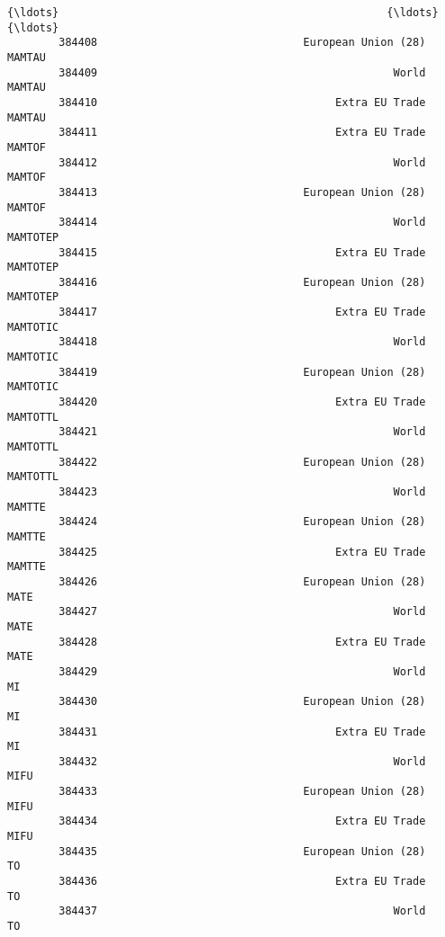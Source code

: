 \documentclass[11pt]{article}
\begin{document}
\begin{Verbatim}[commandchars=\\\{\}]
        {\ldots}                                                   {\ldots}            {\ldots}   
        384408                                European Union (28)       MAMTAU     
        384409                                              World       MAMTAU     
        384410                                     Extra EU Trade       MAMTAU     
        384411                                     Extra EU Trade       MAMTOF     
        384412                                              World       MAMTOF     
        384413                                European Union (28)       MAMTOF     
        384414                                              World       MAMTOTEP   
        384415                                     Extra EU Trade       MAMTOTEP   
        384416                                European Union (28)       MAMTOTEP   
        384417                                     Extra EU Trade       MAMTOTIC   
        384418                                              World       MAMTOTIC   
        384419                                European Union (28)       MAMTOTIC   
        384420                                     Extra EU Trade       MAMTOTTL   
        384421                                              World       MAMTOTTL   
        384422                                European Union (28)       MAMTOTTL   
        384423                                              World       MAMTTE     
        384424                                European Union (28)       MAMTTE     
        384425                                     Extra EU Trade       MAMTTE     
        384426                                European Union (28)       MATE       
        384427                                              World       MATE       
        384428                                     Extra EU Trade       MATE       
        384429                                              World       MI         
        384430                                European Union (28)       MI         
        384431                                     Extra EU Trade       MI         
        384432                                              World       MIFU       
        384433                                European Union (28)       MIFU       
        384434                                     Extra EU Trade       MIFU       
        384435                                European Union (28)       TO         
        384436                                     Extra EU Trade       TO         
        384437                                              World       TO         
        

\end{Verbatim}
\end{document}
